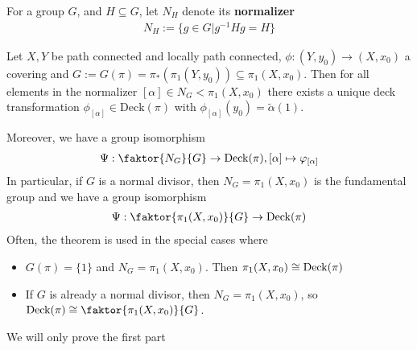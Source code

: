For a group $G$, and $H \subseteq G$, let $N_H$ denote its \textbf{normalizer}
\begin{align*}
  N_H := \{g \in G \big\vert g^{-1}Hg = H\}
\end{align*}
\begin{thm}
  Let $X,Y$ be path connected and locally path connected, $\phi:(Y,y_0) \to (X,x_0)$ a covering and $G := G(\pi) = \pi_{\ast}(\pi_1(Y,y_0)) \subseteq \pi_1(X,x_0)$.
  Then for all elements in the normalizer $[\alpha] \in N_G < \pi_1(X,x_0)$ there exists a unique deck transformation $\phi_{[\alpha]} \in \text{Deck}(\pi)$ with $\phi_{[\alpha]}(y_0) = \tilde{\alpha}(1)$.

  \begin{center}
  \end{center}

  Moreover, we have a group isomorphism
  \begin{align*}
    \Psi: \faktor{N_G}{G} \to  \mathrm{Deck}(\pi), [\alpha] \mapsto  \phi_{[\alpha]} 
  \end{align*}
  In particular, if $G$ is a normal divisor, then $N_G = \pi_1(X,x_0)$ is the fundamental group and we have a group isomorphism
  \begin{align*}
    \Psi: \faktor{\pi_1(X,x_0)}{G} \to \text{Deck}(\pi)
  \end{align*}
  Often, the theorem is used in the special cases where
  \begin{itemize}
    \item $G(\pi) = \{1\}$ and $N_G = \pi_1(X,x_0)$.
      Then $\pi_1(X,x_0) \cong \text{Deck}(\pi)$
    \item If $G$ is already a normal divisor, then $N_G = \pi_1(X,x_0)$, so $\text{Deck}(\pi) \iso \faktor{\pi_1(X,x_0)}{G}$.
  \end{itemize}
\end{thm}
We will only prove the first part
